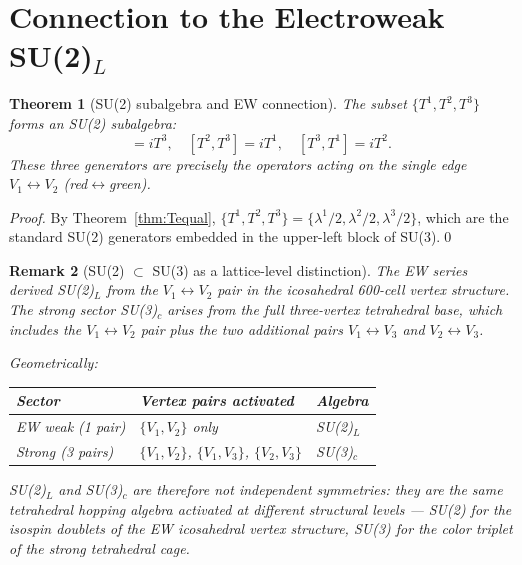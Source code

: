\documentclass[11pt,a4paper]{article}
\newtheorem{theorem}{Theorem}[section]
\newtheorem{remark}[theorem]{Remark}
\begin{document}
\section{Connection to the Electroweak SU(2)$_L$}

\begin{theorem}[SU(2) subalgebra and EW connection]
\label{thm:su2sub}
The subset $\{T^1, T^2, T^3\}$ forms an SU(2) subalgebra:
\begin{equation}
[T^1, T^2] = iT^3,\quad
[T^2, T^3] = iT^1,\quad
[T^3, T^1] = iT^2.
\label{eq:su2sub}
\end{equation}
These three generators are precisely the operators acting on the
single edge $V_1 \leftrightarrow V_2$ (red$\leftrightarrow$green).
\end{theorem}

\begin{proof}
By Theorem~\ref{thm:Tequal}, $\{T^1,T^2,T^3\} = \{\lambda^1/2,
\lambda^2/2, \lambda^3/2\}$, which are the standard SU(2) generators
embedded in the upper-left block of SU(3).\qed
\end{proof}

\begin{remark}[SU(2) $\subset$ SU(3) as a lattice-level distinction]
The EW series derived SU(2)$_L$ from the $V_1 \leftrightarrow V_2$
pair in the icosahedral 600-cell vertex structure.  The strong sector
SU(3)$_c$ arises from the full three-vertex tetrahedral base, which
includes the $V_1 \leftrightarrow V_2$ pair plus the two additional
pairs $V_1 \leftrightarrow V_3$ and $V_2 \leftrightarrow V_3$.

Geometrically:
\begin{center}
\begin{tabular}{@{}lll@{}}
\toprule
Sector & Vertex pairs activated & Algebra \\
\midrule
EW weak (1 pair) & $\{V_1, V_2\}$ only & SU(2)$_L$ \\
Strong (3 pairs) & $\{V_1,V_2\}$, $\{V_1,V_3\}$, $\{V_2,V_3\}$ & SU(3)$_c$ \\
\bottomrule
\end{tabular}
\end{center}

SU(2)$_L$ and SU(3)$_c$ are therefore not independent symmetries:
they are the same tetrahedral hopping algebra activated at
different structural levels --- SU(2) for the isospin doublets
of the EW icosahedral vertex structure, SU(3) for the color
triplet of the strong tetrahedral cage.
\end{remark}
\end{document}
